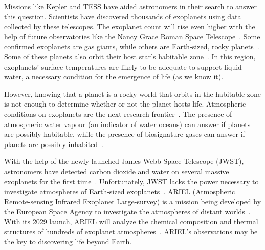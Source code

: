 Missions like Kepler and TESS have aided astronomers in their search to answer this question. Scientists have discovered thousands of exoplanets using data collected by these telescopes.
The exoplanet count will rise even higher with the help of future observatories like the Nancy Grace Roman Space Telescope~\cite{johnson2020predictions}.
Some confirmed exoplanets are gas giants, while others are Earth-sized, rocky planets~\cite{Stassun:2018:AJ, Guerrero:2021:ApJS}. 
Some of these planets also orbit their host star’s habitable zone~\cite{Gillon:2017:Natur, Wolf:2017:ApJL, Agol:2021:PSJ, Zechmeister:2019:AA}.
In this region, exoplanets' surface temperatures are likely to be adequate to support liquid water, a necessary condition for the emergence of life (as we know it).

However, knowing that a planet is a rocky world that orbits in the habitable zone is not enough to determine whether or not the planet hosts life.
Atmospheric conditions on exoplanets are the next research frontier~\cite{seager2010exoplanet}.
The presence of atmospheric water vapour (an indicator of water oceans) can answer if planets are possibly habitable, while the presence of biosignature gases can answer if planets are possibly inhabited~\cite{seager2010exoplanet}.

With the help of the newly launched James Webb Space Telescope (JWST), astronomers have detected carbon dioxide and water on several massive exoplanets for the first time~\cite{gardner2006james, early2022identification, pontoppidan2022jwst}.
Unfortunately, JWST lacks the power necessary to investigate atmospheres of Earth-sized exoplanets~\cite{pontoppidan2022jwst}.
ARIEL (Atmospheric Remote-sensing Infrared Exoplanet Large-survey) is a mission being developed by the European Space Agency to investigate the atmospheres of distant worlds~\cite{puig2016ariel}.
With its 2029 launch, ARIEL will analyze the chemical composition and thermal structures of hundreds of exoplanet atmospheres~\cite{puig2016ariel}.
ARIEL's observations may be the key to discovering life beyond Earth.

